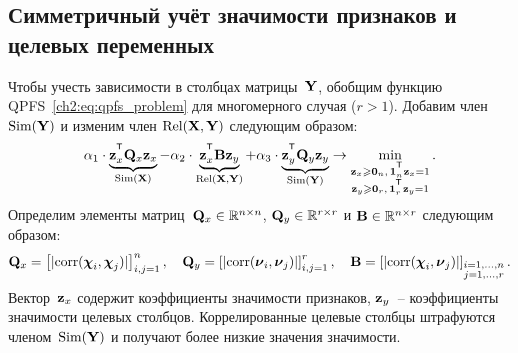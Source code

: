\subsection{Симметричный учёт значимости признаков и целевых переменных}
Чтобы учесть зависимости в столбцах матрицы~$\mathbf{Y}$, обобщим функцию QPFS~\eqref{ch2:eq:qpfs_problem} для многомерного случая ($r > 1$).
Добавим член~$\text{Sim}(\mathbf{Y})$ и изменим член $\text{Rel}(\mathbf{X}, \mathbf{Y})$ следующим образом:
\begin{equation}
\alpha_1 \cdot \underbrace{\bz_x^{\T} \bQ_x \bz_x}_{\text{Sim}(\bX)} - \alpha_2 \cdot \underbrace{\bz_x^{\T} \bB \bz_y}_{\text{Rel}(\bX, \bY)} + \alpha_3 \cdot \underbrace{\bz_y^{\T} \bQ_y \bz_y}_{\text{Sim}(\bY)} \rightarrow \min_{\substack{\bz_x \geq \bZero_n, \, \bOne_n^{\T}\bz_x=1 \\ \bz_y \geq \bZero_r, \, \bOne_r^{\T}\bz_y=1}}.
\label{ch2:eq:symimp}
\end{equation}
Определим элементы матриц~$\mathbf{Q}_x \in \mathbb{R}^{n \times n}$, $\mathbf{Q}_y \in \mathbb{R}^{r \times r}$ и $\mathbf{B} \in \mathbb{R}^{n \times r}$ следующим образом:
\begin{equation*}
\mathbf{Q}_x = \left[ |\text{corr}(\boldsymbol{\chi}_i, \boldsymbol{\chi}_j)| \right]_{i,j=1}^n, \quad
\mathbf{Q}_y = \left[ |\text{corr}(\boldsymbol{\nu}_i, \boldsymbol{\nu}_j)| \right]_{i,j=1}^r, \quad
\mathbf{B} =  \left[ |\text{corr}(\boldsymbol{\chi}_i, \boldsymbol{\nu}_j)| \right]_{\substack{i=1, \dots, n \\ j=1, \dots, r}}.
\end{equation*}
Вектор~$\mathbf{z}_x$ содержит коэффициенты значимости признаков, $\mathbf{z}_y$~-- коэффициенты значимости целевых столбцов.
Коррелированные целевые столбцы штрафуются членом~$\text{Sim}(\mathbf{Y})$ и получают более низкие значения значимости.

